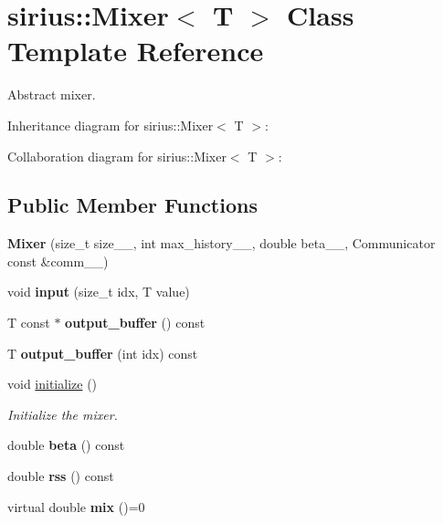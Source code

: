 \hypertarget{classsirius_1_1_mixer}{}\section{sirius\+:\+:Mixer$<$ T $>$ Class Template Reference}
\label{classsirius_1_1_mixer}


Abstract mixer.  




Inheritance diagram for sirius\+:\+:Mixer$<$ T $>$\+:


Collaboration diagram for sirius\+:\+:Mixer$<$ T $>$\+:
\subsection*{Public Member Functions}
\begin{DoxyCompactItemize}
\item 
\hypertarget{classsirius_1_1_mixer_a992798b9139b272dbc90fa02ee3554f7}{}{\bfseries Mixer} (size\+\_\+t size\+\_\+\+\_\+, int max\+\_\+history\+\_\+\+\_\+, double beta\+\_\+\+\_\+, Communicator const \&comm\+\_\+\+\_\+)\label{classsirius_1_1_mixer_a992798b9139b272dbc90fa02ee3554f7}

\item 
\hypertarget{classsirius_1_1_mixer_a4a702d01730968716c3ceb9662f34330}{}void {\bfseries input} (size\+\_\+t idx, T value)\label{classsirius_1_1_mixer_a4a702d01730968716c3ceb9662f34330}

\item 
\hypertarget{classsirius_1_1_mixer_aa7ea714ec63376d42e5a7b8699f78f34}{}T const $\ast$ {\bfseries output\+\_\+buffer} () const \label{classsirius_1_1_mixer_aa7ea714ec63376d42e5a7b8699f78f34}

\item 
\hypertarget{classsirius_1_1_mixer_a1b1aa343a1f2f558d49e6d3fc186f5f6}{}T {\bfseries output\+\_\+buffer} (int idx) const \label{classsirius_1_1_mixer_a1b1aa343a1f2f558d49e6d3fc186f5f6}

\item 
void \hyperlink{classsirius_1_1_mixer_a858975fc0a5b820b6c2abb3aab5abf64}{initialize} ()
\begin{DoxyCompactList}\small\item\em Initialize the mixer. \end{DoxyCompactList}\item 
\hypertarget{classsirius_1_1_mixer_a7ac9a2f29dcb28679cbdbb4ad03e4844}{}double {\bfseries beta} () const \label{classsirius_1_1_mixer_a7ac9a2f29dcb28679cbdbb4ad03e4844}

\item 
\hypertarget{classsirius_1_1_mixer_adac7d91a9526fd5ae2a0d0f6cf733425}{}double {\bfseries rss} () const \label{classsirius_1_1_mixer_adac7d91a9526fd5ae2a0d0f6cf733425}

\item 
\hypertarget{classsirius_1_1_mixer_a47e02f2a23003e7b558e382434b35b59}{}virtual double {\bfseries mix} ()=0\label{classsirius_1_1_mixer_a47e02f2a23003e7b558e382434b35b59}

\end{DoxyCompactItemize}
